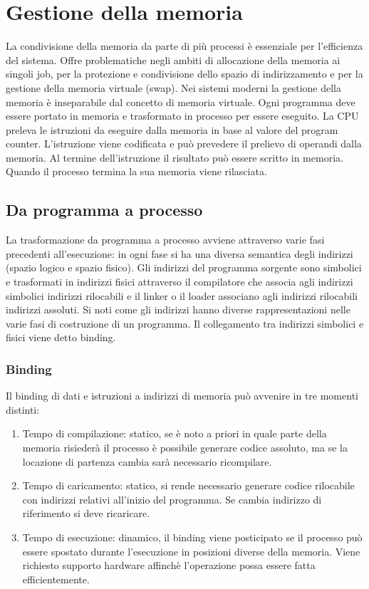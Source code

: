 \chapter{Gestione della memoria}
La condivisione della memoria da parte di pi\`u processi \`e essenziale per l'efficienza del sistema. Offre problematiche negli ambiti di allocazione della memoria ai singoli job, per
la protezione e condivisione dello spazio di indirizzamento e per la gestione della memoria virtuale (swap). Nei sistemi moderni la gestione della memoria \`e inseparabile dal concetto
di memoria virtuale. Ogni programma deve essere portato in memoria e trasformato in processo per essere eseguito. La CPU preleva le istruzioni da eseguire dalla memoria in base al
valore del program counter. L'istruzione viene codificata e pu\`o prevedere il prelievo di operandi dalla memoria. Al termine dell'istruzione il risultato pu\`o essere scritto in 
memoria. Quando il processo termina la sua memoria viene rilasciata. 
\section{Da programma a processo}
La trasformazione da programma a processo avviene attraverso varie fasi precedenti all'esecuzione: in ogni fase si ha una diversa semantica degli indirizzi (spazio logico e spazio
fisico). Gli indirizzi del programma sorgente sono simbolici e trasformati in indirizzi fisici attraverso il compilatore che associa agli indirizzi simbolici indirizzi rilocabili
e il linker o il loader associano agli indirizzi rilocabili indirizzi assoluti. Si noti come gli indirizzi hanno diverse rappresentazioni nelle varie fasi di costruzione di un programma.
Il collegamento tra indirizzi simbolici e fisici viene detto binding.
\subsection{Binding}
Il binding di dati e istruzioni a indirizzi di memoria pu\`o avvenire in tre momenti distinti:
\begin{enumerate}
	\item Tempo di compilazione: statico, se \`e noto a priori in quale parte della memoria risieder\`a il processo \`e possibile generare codice assoluto, ma se la locazione di 
		partenza cambia sar\`a necessario ricompilare.
	\item Tempo di caricamento: statico, si rende necessario generare codice rilocabile con indirizzi relativi all'inizio del programma. Se cambia indirizzo di riferimento si deve
		ricaricare. 
	\item Tempo di esecuzione: dinamico, il binding viene posticipato se il processo pu\`o essere spostato durante l'esecuzione in posizioni diverse della memoria. Viene richiesto 
		supporto hardware affinch\`e l'operazione possa essere fatta efficientemente. 
\end{enumerate}
